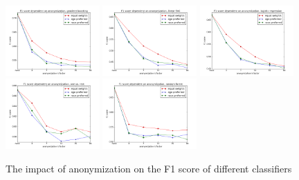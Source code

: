 \documentclass{llncs}
\begin{document}
\begin{figure}[H]
	\begin{center}
		\includegraphics[width=0.32\textwidth]{figures/results/anon_gradient_boost}
		\includegraphics[width=0.32\textwidth]{figures/results/anon_linear_svc}
		\includegraphics[width=0.32\textwidth]{figures/results/anon_logistic_regression}
		\includegraphics[width=0.32\textwidth]{figures/results/anon_onevsrest_bagging}
		\includegraphics[width=0.32\textwidth]{figures/results/anon_random_forest}
		\caption{The impact of anonymization on the F1 score of different classifiers}
		\label{fig:adult_results_anonymization}
	\end{center}
\end{figure}
\end{document}
